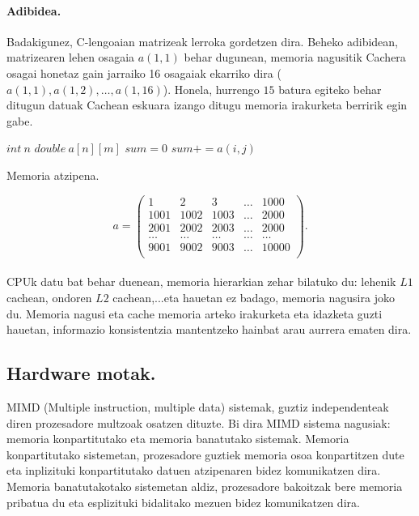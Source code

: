 \paragraph*{\textbf{Adibidea}.}Badakigunez, C-lengoaian matrizeak lerroka gordetzen dira. Beheko adibidean,  matrizearen lehen osagaia $a(1,1)$ behar dugunean, memoria nagusitik Cachera osagai honetaz gain jarraiko 16 osagaiak ekarriko dira ($a(1,1),a(1,2),\dots,a(1,16)$). Honela, hurrengo $15$ batura egiteko behar ditugun datuak Cachean eskuara izango ditugu memoria irakurketa berririk egin gabe. 

\begin{algorithm}[h]
 \BlankLine
  $int \ n$\;
  $double \ a[n][m]$\;
  \BlankLine
  $sum=0$\;
  {
   \BlankLine
   {
    \BlankLine 
    $sum+=a(i,j)$\;
   }
 }
 \caption{Memoria atzipena.}
\end{algorithm} 

\begin{equation*}
a=\left(\begin{array}{ccccc}
  1    & 2    & 3    & \dots & 1000 \\
  1001 & 1002 & 1003 &\dots & 2000 \\
  2001 & 2002 & 2003 &\dots & 2000 \\
  \dots & \dots & \dots & \dots & \dots \\
  9001 & 9002 & 9003 &\dots & 10000 \\
  \end{array}\right).  
\end{equation*}

\paragraph*{}CPUk datu bat behar duenean, memoria hierarkian zehar bilatuko du: lehenik $L1$ cachean, ondoren $L2$ cachean,...eta hauetan ez badago, memoria nagusira joko du. Memoria nagusi eta cache memoria arteko irakurketa eta idazketa guzti hauetan,  informazio konsistentzia mantentzeko hainbat arau aurrera ematen dira.  

\subsection{Hardware motak.}

MIMD (Multiple instruction, multiple data) sistemak, guztiz independenteak diren prozesadore multzoak osatzen dituzte. Bi dira MIMD sistema nagusiak: memoria konpartitutako eta memoria banatutako sistemak. Memoria konpartitutako sistemetan, prozesadore guztiek memoria osoa konpartitzen dute eta inplizituki konpartitutako datuen atzipenaren bidez komunikatzen dira. Memoria banatutakotako sistemetan aldiz, prozesadore bakoitzak bere memoria pribatua du eta esplizituki bidalitako mezuen bidez komunikatzen dira.

